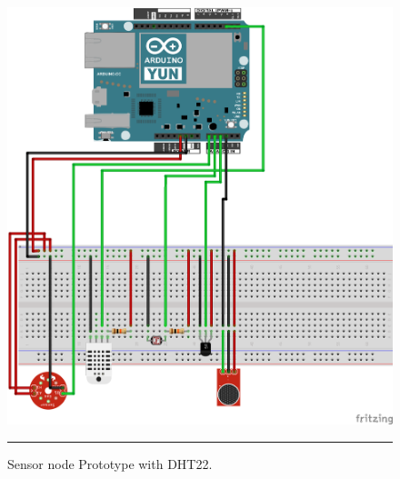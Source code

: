 \documentclass[12pt, a4paper,twoside]{tesi_upf}
\begin{document}
      \begin{figure}[!htbp]
          \centering
              \includegraphics[scale=0.8]{./Figures/Fritzing/AllSensors22_bb.png}
              \rule{25em}{0.5pt}
          \caption[Sensor node Prototype with DHT22]{Sensor node Prototype with DHT22.}
          \label{fig:AllSensors22_bb}
      \end{figure}
      
\end{document}
